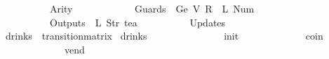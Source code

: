 {\ \ \ \ \ \ \ \ \ \ Arity\ {\isacharequal}\ {}{\isacharcomma}\isanewline
\ \ \ \ \ \ \ \ \ \ Guards\ {\isacharequal}\ {\isacharbrackleft}Ge\ {\isacharparenleft}V\ {\isacharparenleft}R\ {}{\isacharparenright}{\isacharparenright}\ {\isacharparenleft}L\ {\isacharparenleft}Num\ {}{\isacharparenright}{\isacharparenright}{\isacharbrackright}{\isacharcomma}\isanewline
\ \ \ \ \ \ \ \ \ \ Outputs\ {\isacharequal}\ {\isacharbrackleft}L\ {\isacharparenleft}Str\ {\isacharprime}{\isacharprime}tea{\isacharprime}{\isacharprime}{\isacharparenright}{\isacharbrackright}{\isacharcomma}\isanewline
\ \ \ \ \ \ \ \ \ \ Updates\ {\isacharequal}\ {\isacharbrackleft}{\isacharbrackright}\isanewline
\ \ \ \ \ \ \ \ {\isasymrparr}{\isachardoublequoteclose}\isanewline
\isanewline
{}\isamarkupfalse%
\ drinks\ {\isacharcolon}{\isacharcolon}\ {\isachardoublequoteopen}transition{\isacharunderscore}matrix{\isachardoublequoteclose}\ \isanewline
{\isachardoublequoteopen}drinks\ {\isasymequiv}\ {\isacharbraceleft}{\isacharbar}\isanewline
\ \ \ \ \ \ \ \ \ \ \ \ {\isacharparenleft}{\isacharparenleft}{}{\isacharcomma}{}{\isacharparenright}{\isacharcomma}\ init{\isacharparenright}{\isacharcomma}\isanewline
\ \ \ \ \ \ \ \ \ \ \ \ {\isacharparenleft}{\isacharparenleft}{}{\isacharcomma}{}{\isacharparenright}{\isacharcomma}\ coin{\isacharparenright}{\isacharcomma}\isanewline
\ \ \ \ \ \ \ \ \ \ \ \ {\isacharparenleft}{\isacharparenleft}{}{\isacharcomma}{}{\isacharparenright}{\isacharcomma}\ vend{\isacharparenright}\isanewline
\ \ \ \ \ \ \ \ \ \ {\isacharbar}{\isacharbraceright}{\isachardoublequoteclose}%
}%
